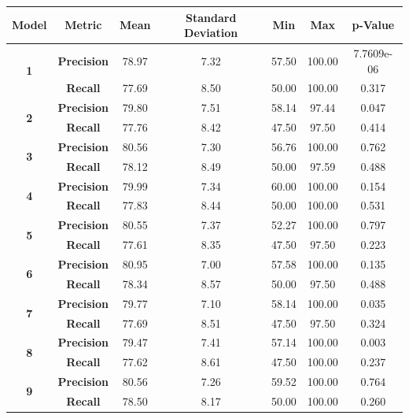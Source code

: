 \documentclass{article}
\begin{document}
\begin{table}[h]
\centering

\begin{tabular}{|c|c|c|c|c|c|c|} \hline
{\bf Model} & {\bf Metric} & {\bf Mean} & {\bf Standard Deviation} & {\bf Min} & {\bf Max}  & {\bf p-Value}\\ \hline

\multirow{2}{*}{{\bf 1}} & {\bf Precision} & 78.97 & 7.32 & 57.50& 100.00& 7.7609e-06\\  
& {\bf Recall} & 77.69&8.50 &50.00 &100.00 &0.317\\ \hline

\multirow{2}{*}{{\bf 2}} & {\bf Precision} &79.80 &7.51 & 58.14& 97.44&0.047\\  
& {\bf Recall} &77.76 &8.42 & 47.50 &97.50 & 0.414\\ \hline

\multirow{2}{*}{{\bf 3}} & {\bf Precision} & 80.56 & 7.30 & 56.76& 100.00&0.762\\  
& {\bf Recall} & 78.12 & 8.49& 50.00& 97.59& 0.488\\ \hline

\multirow{2}{*}{{\bf 4}} & {\bf Precision} & 79.99 & 7.34& 60.00& 100.00&0.154\\  
& {\bf Recall} & 77.83&8.44& 50.00& 100.00& 0.531\\ \hline

\multirow{2}{*}{{\bf 5}} & {\bf Precision} &80.55 &7.37 &52.27 &100.00 &0.797\\  
& {\bf Recall} & 77.61 & 8.35 & 47.50 & 97.50 &0.223\\ \hline

\multirow{2}{*}{{\bf 6}} & {\bf Precision} & 80.95 & 7.00 &57.58 &100.00 & 0.135\\  
& {\bf Recall} & 78.34 & 8.57 & 50.00&97.50 & 0.488\\ \hline

\multirow{2}{*}{{\bf 7}} & {\bf Precision} & 79.77 & 7.10 & 58.14& 100.00& 0.035\\  
& {\bf Recall} & 77.69 & 8.51 & 47.50& 97.50&0.324\\ \hline

\multirow{2}{*}{{\bf 8}} & {\bf Precision} & 79.47 & 7.41 &57.14 &100.00 & 0.003\\  
& {\bf Recall} & 77.62& 8.61& 47.50& 100.00& 0.237\\ \hline

\multirow{2}{*}{{\bf 9}} & {\bf Precision} & 80.56 & 7.26& 59.52& 100.00& 0.764\\  
& {\bf Recall} & 78.50 &8.17 &50.00 & 100.00& 0.260\\ \hline


\end{tabular}
\end{table}
\end{document}
